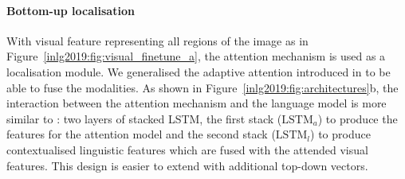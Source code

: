 \paragraph{Bottom-up localisation}
With visual feature representing all regions of the image as in Figure~\ref{inlg2019:fig:visual_finetune_a}, the attention mechanism is used %
as a localisation module. %
We generalised %
the adaptive attention introduced in \cite{lu2017knowing} to be able to fuse the modalities.
As shown in Figure~\ref{inlg2019:fig:architectures}b, the interaction between the attention mechanism and the language model is more similar to \cite{anderson2018bottom}: two layers of stacked LSTM, the first stack ($\mathrm{LSTM}_a$) to produce the features for the attention model and the second stack ($\mathrm{LSTM}_l$) to produce contextualised linguistic features which are fused with the attended visual features.
This design is easier to extend with additional top-down vectors.

